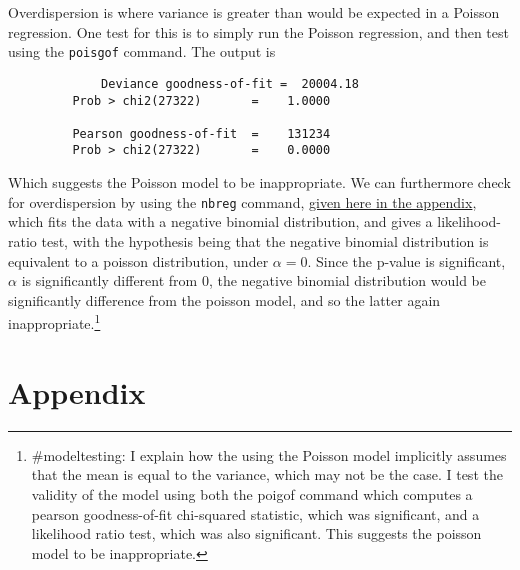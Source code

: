 \documentclass{article}
\begin{document}
\begin{enumerate}[label=(\alph*)]
Overdispersion is where variance is greater than would be expected in a Poisson regression. One test for this is to simply run the Poisson regression, and then test using the \texttt{poisgof} command. The output is \begin{verbatim}
	         Deviance goodness-of-fit =  20004.18
         Prob > chi2(27322)       =    1.0000

         Pearson goodness-of-fit  =    131234
         Prob > chi2(27322)       =    0.0000
\end{verbatim}
Which suggests the Poisson model to be inappropriate. We can furthermore check for overdispersion by using the \texttt{nbreg} command, \hyperlink{nbreg}{given here in the appendix}, which fits the data with a negative binomial distribution, and gives a likelihood-ratio test, with the hypothesis being that the negative binomial distribution is equivalent to a poisson distribution, under $\alpha = 0$. Since the p-value is significant, $\alpha$ is significantly different from 0, the negative binomial distribution would be significantly difference from the poisson model, and so the latter again inappropriate.\footnote{\#modeltesting: I explain how the using the Poisson model implicitly assumes that the mean is equal to the variance, which may not be the case. I test the validity of the model using both the poigof command which computes a pearson goodness-of-fit chi-squared statistic, which was significant, and a likelihood ratio test, which was also significant. This suggests the poisson model to be inappropriate.}


\end{enumerate}

\newpage

\section{Appendix}
\end{document}
